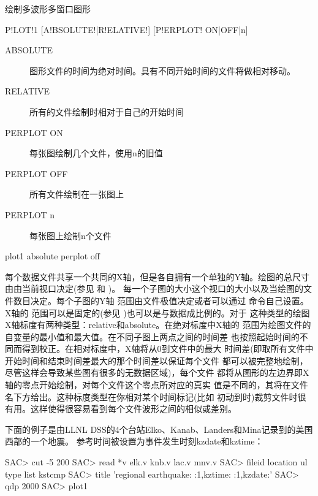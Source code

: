\label{cmd:plot1}

绘制多波形多窗口图形

\begin{SACSTX}
P!LOT!1 [A!BSOLUTE!|R!ELATIVE!] [P!ERPLOT! ON|OFF|n]
\end{SACSTX}

\begin{description}
\item [ABSOLUTE] 图形文件的时间为绝对时间。具有不同开始时间的文件将做相对移动。
\item [RELATIVE] 所有的文件绘制时相对于自己的开始时间
\item [PERPLOT ON] 每张图绘制几个文件，使用n的旧值
\item [PERPLOT OFF] 所有文件绘制在一张图上
\item [PERPLOT n] 每张图上绘制n个文件
\end{description}

\begin{SACDFT}
plot1 absolute perplot off
\end{SACDFT}

每个数据文件共享一个共同的X轴，但是各自拥有一个单独的Y轴。绘图的总尺寸
由由当前视口决定(参见  和 )。
每一个子图的大小这个视口的大小以及当绘图的文件数目决定。每个子图的Y轴
范围由文件极值决定或者可以通过  命令自己设置。X轴的
范围可以是固定的(参见 )也可以是与数据成比例的。对于
这种类型的绘图X轴标度有两种类型：relative和absolute。在绝对标度中X轴的
范围为绘图文件的自变量的最小值和最大值。在不同子图上两点之间的时间差
也按照起始时间的不同而得到校正。在相对标度中，X轴将从0到文件中的最大
时间差(即取所有文件中开始时间和结束时间差最大的那个时间差以保证每个文件
都可以被完整地绘制，尽管这样会导致某些图有很多的无数据区域)，每个文件
都将从图形的左边界即X轴的零点开始绘制，对每个文件这个零点所对应的真实
值是不同的，其将在文件名下方给出。这种标度类型在你相对某个时间标记(比如
初动到时)裁剪文件时很有用。这样使得很容易看到每个文件波形之间的相似或差别。

下面的例子是由LLNL DSS的4个台站Elko、Kanab、Landers和Mina记录到的美国西部的一个地震。
参考时间被设置为事件发生时刻kzdate和kztime：
\begin{SACCode}
SAC> cut -5 200
SAC> read *v
 elk.v knb.v lac.v mnv.v
SAC> fileid location ul type list kstcmp
SAC> title 'regional earthquake:  :1,kztime:  :1,kzdate:'
SAC> qdp 2000
SAC> plot1
\end{SACCode}
